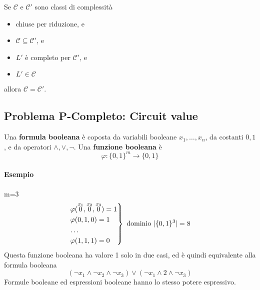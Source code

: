 \begin{property}
    Se $\mathcal{C}$ e $\mathcal{C}'$ sono classi di complessità 
    \begin{itemize}
        \item chiuse per riduzione, e
        \item $\mathcal{C}\subseteq\mathcal{C}'$, e 
        \item $L'$ è completo per $\mathcal{C}'$, e
        \item $L'\in\mathcal{C}$
    \end{itemize}
    allora $\mathcal{C}=\mathcal{C}'$.
\end{property}

\begin{center}
\end{center}



\subsection{Problema P-Completo: Circuit value}
Una \textbf{formula booleana} è coposta da variabili booleane $x_1,\dots,x_n$, da costanti $0,1$, e da operatori $\land,\lor,\lnot$. Una \textbf{funzione booleana} è 
$$
    \varphi:\{0,1\}^m\to\{0,1\}
$$

\paragraph{Esempio} m=3
$$
    \begin{rcases*}
        \varphi(\overset{x_1}{0},\overset{x_2}{0},\overset{x_3}{0})=1\\
        \varphi(0,1,0)=1\\
        \dots\\
        \varphi(1,1,1)=0
    \end{rcases*} \text{ dominio } |\{0,1\}^3|=8
$$
Questa funzione booleana ha valore 1 solo in due casi, ed è quindi equivalente alla formula booleana
$$
    (\lnot x_1\land \lnot x_2\land \lnot x_3) \lor (\lnot x_1\land 2\land \lnot x_3)
$$
Formule booleane ed espressioni booleane hanno lo stesso potere espressivo.\medskip

